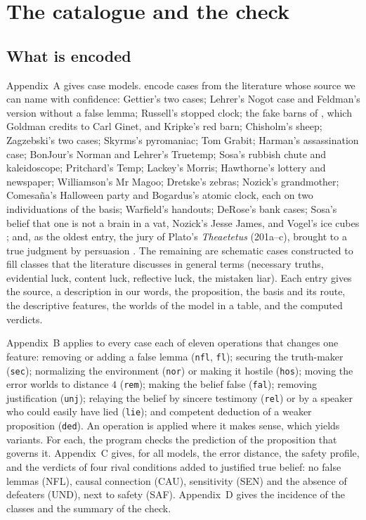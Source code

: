 \documentclass{situationist-preprint}
\begin{document}
\section{The catalogue and the check}\label{s:cat}

\subsection{What is encoded}

Appendix~A gives \stnsources{} case models. \stnlit{} encode cases from the literature whose source we can name with confidence: Gettier's two cases; Lehrer's Nogot case and Feldman's version without a false lemma; Russell's stopped clock; the fake barns of \citet{Goldman1976}, which Goldman credits to Carl Ginet, and Kripke's red barn; Chisholm's sheep; Zagzebski's two cases; Skyrms's pyromaniac; Tom Grabit; Harman's assassination case; BonJour's Norman and Lehrer's Truetemp; Sosa's rubbish chute and kaleidoscope; Pritchard's Temp; Lackey's Morris; Hawthorne's lottery and newspaper; Williamson's Mr Magoo; Dretske's zebras; Nozick's grandmother; Comesa\~na's Halloween party and Bogardus's atomic clock, each on two individuations of the basis; Warfield's handouts; DeRose's bank cases; Sosa's belief that one is not a brain in a vat, Nozick's Jesse James, and Vogel's ice cubes \citep{Vogel1987}; and, as the oldest entry, the jury of Plato's \emph{Theaetetus} (201a--c), brought to a true judgment by persuasion \citep{PlatoTht}. The remaining \stnschem{} are schematic cases constructed to fill classes that the literature discusses in general terms (necessary truths, evidential luck, content luck, reflective luck, the mistaken liar). Each entry gives the source, a description in our words, the proposition, the basis and its route, the descriptive features, the worlds of the model in a table, and the computed verdicts.

Appendix~B applies to every case each of eleven operations that changes one feature: removing or adding a false lemma (\texttt{nfl}, \texttt{fl}); securing the truth-maker (\texttt{sec}); normalizing the environment (\texttt{nor}) or making it hostile (\texttt{hos}); moving the error worlds to distance $4$ (\texttt{rem}); making the belief false (\texttt{fal}); removing justification (\texttt{unj}); relaying the belief by sincere testimony (\texttt{rel}) or by a speaker who could easily have lied (\texttt{lie}); and competent deduction of a weaker proposition (\texttt{ded}). An operation is applied where it makes sense, which yields \stnvariants{} variants. For each, the program checks the prediction of the proposition that governs it. Appendix~C gives, for all \stnmodels{} models, the error distance, the safety profile, and the verdicts of four rival conditions added to justified true belief: no false lemmas (NFL), causal connection (CAU), sensitivity (SEN) and the absence of defeaters (UND), next to safety (SAF). Appendix~D gives the incidence of the classes and the summary of the check.
\end{document}
